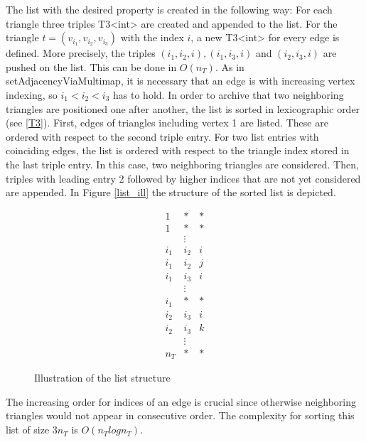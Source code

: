 \documentclass[10pt]{article}
\begin{document}
The list with the desired property is created in the following way: For each triangle three triples {\ttfamily T3<int>} are created and appended to the list. For the triangle $t = (v_{i_1},v_{i_2},v_{i_3})$ with the index $i$, a new {\ttfamily T3<int>} for every edge is defined. More precisely, the triples $({i_1},{i_2},i), ({i_1},{i_3},i)$ and $({i_2},{i_3},i)$ are pushed on the list. This can be done in $O(n_T)$. As in {\ttfamily setAdjacencyViaMultimap}, it is necessary that an edge is with increasing vertex indexing, so $i_1 < i_2 < i_3$ has to hold. In order to archive that two neighboring triangles are positioned one after another, the list is sorted in lexicographic order (see \ref{T3}). First, edges of triangles including vertex 1 are listed. These are ordered with respect to the second triple entry. For two list entries with coinciding edges, the list is ordered with respect to the triangle index stored in the last triple entry. In this case, two neighboring triangles are considered. Then, triples with leading entry 2 followed by higher indices that are not yet considered are appended. In Figure \ref{list_ill} the structure of the sorted list is depicted.

\begin{equation*}
\begin{matrix}
1 & * & * \\
1 & * & * \\
& \vdots & \\
i_1 & i_2 & i \\
i_1 & i_2 & j \\
i_1 & i_3 & i \\
& \vdots & \\
i_1 & * & * \\
i_2 & i_3 & i \\
i_2 & i_3 & k \\
& \vdots & \\
n_T & * & * 
\end{matrix}
\end{equation*}
\begin{figure}[h]
	\caption{Illustration of the list structure}
\end{figure}
\label{list_ill}

The increasing order for indices of an edge is crucial since otherwise neighboring triangles would not appear in consecutive order. The complexity for sorting this list of size $ 3 n_T$ is $O(n_Tlogn_T)$.
\end{document}
